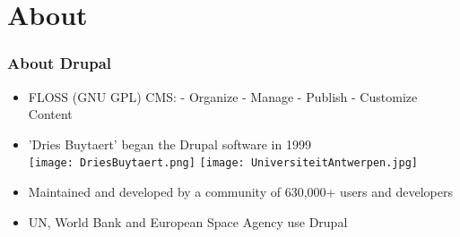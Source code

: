 \section{About}

\begin{frame}[allowframebreaks]
\frametitle{About Drupal}

\begin{itemize}
	\item FLOSS (GNU GPL) CMS: \linebreak
	- Organize\linebreak
	- Manage\linebreak
	- Publish\linebreak
	- Customize Content
	\item 'Dries Buytaert' began the Drupal software in 1999\\
	\texttt{[image: DriesBuytaert.png]}
	\texttt{[image: UniversiteitAntwerpen.jpg]} 
	\item Maintained and developed by a community of 630,000+ users and developers
	\item UN, World Bank and European Space Agency use Drupal
\end{itemize}

\end{frame}
